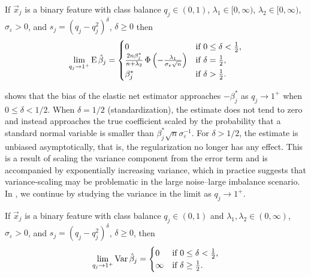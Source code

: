 \begin{theorem}
  \label{thm:classbalance-bias}
  If \(\vec{x}_j\) is a binary feature with class balance \(q_j \in (0, 1)\), \(\lambda_1 \in [0,\infty)\), \(\lambda_2 \in [0,\infty)\), \(\sigma_\varepsilon > 0\), and \(s_j = (q_j - q_j^2)^{\delta}\), \(\delta \geq 0\)  then
  \[
    \lim_{q_j \rightarrow 1^+} \operatorname{E} \hat{\beta}_j =
    \begin{cases}
      0                                                                                                  & \text{if } 0 \leq \delta < \frac{1}{2}, \\
      \frac{2n \beta_j^*}{n + \lambda_2} \operatorname{\Phi}\left(-\frac{\lambda_1}{\sigma_\varepsilon \sqrt{n}}\right) & \text{if } \delta = \frac{1}{2},        \\
      \beta^*_j                                                                                          & \text{if } \delta > \frac{1}{2}.
    \end{cases}
  \]
\end{theorem}

 shows that the bias of the elastic net estimator approaches
\(-\beta_j^*\) as \(q_j \rightarrow 1^+\) when \(0 \leq \delta < 1/2\). When \(\delta =
1/2\) (standardization), the estimate does not tend to zero and instead approaches the true
coefficient scaled by the probability that a standard normal variable is smaller than
\(\beta_j^*\sqrt{n}\sigma_\varepsilon^{-1}\). For \(\delta > 1/2\), the estimate is
unbiased asymptotically, that is, the regularization no longer has any effect. This is a
result of scaling the variance component from the error term and is accompanied by
exponentially increasing variance, which in practice suggests that variance-scaling may be
problematic in the large noise--large imbalance scenario. In
, we continue by studying the variance in the limit as
\(q_j \rightarrow 1^+\).

\begin{theorem}
  \label{thm:classbalance-variance}
  If \(\vec{x}_j\) is a binary feature with class balance \(q_j \in (0, 1)\) and \(\lambda_1,\lambda_2 \in (0,\infty)\), \(\sigma_\varepsilon > 0\), and \(s_j = (q_j - q_j^2)^{\delta}\), \(\delta \geq 0\), then
  \[
    \lim_{q_j \rightarrow 1^+} \operatorname{Var} \hat{\beta}_j =
    \begin{cases}
      0      & \text{if } 0 \leq \delta < \frac{1}{2}, \\
      \infty & \text{if } \delta \geq \frac{1}{2}.
    \end{cases}
  \]
\end{theorem}

